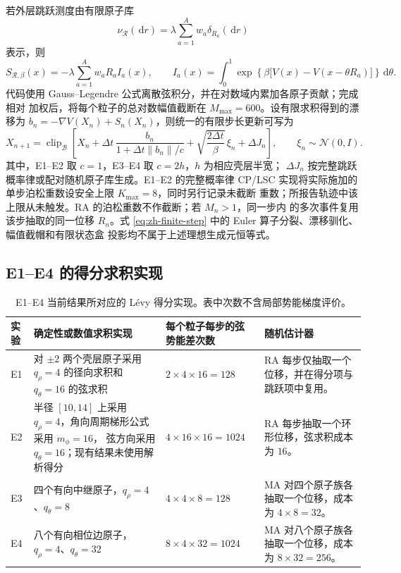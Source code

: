\documentclass[11pt,a4paper]{article}
\newcommand{\dd}{\,\mathrm{d}}
\begin{document}
若外层跳跃测度由有限原子库
\begin{equation}
 \nu_{\mathcal R}(\dd r)
 =\lambda\sum_{a=1}^{A}w_a\delta_{R_a}(\dd r)
\end{equation}
表示，则
\begin{equation}
 S_{\mathcal R,\beta}(x)
 =-\lambda\sum_{a=1}^{A}w_aR_a I_a(x),\qquad
 I_a(x)=\int_0^1
 \exp\!\left\{\beta\bigl[V(x)-V(x-\theta R_a)\bigr]\right\}\dd\theta .
\end{equation}
代码使用 Gauss--Legendre 公式离散弦积分，并在对数域内累加各原子贡献；完成相对
加权后，将每个粒子的总对数幅值截断在 $M_{\max}=600$。设有限求积得到的漂移为
$b_n=-\nabla V(X_n)+S_n(X_n)$，则统一的有限步长更新可写为
\begin{equation}
 X_{n+1}
 =\operatorname{clip}_{\mathcal B}\!\left[
 X_n+\Delta t\,\frac{b_n}{1+\Delta t\|b_n\|/c}
 +\sqrt{\frac{2\Delta t}{\beta}}\,\xi_n+\Delta J_n
 \right],
 \qquad \xi_n\sim\mathcal N(0,I).
 \label{eq:zh-finite-step}
\end{equation}
其中，E1--E2 取 $c=1$，E3--E4 取 $c=2h$，$h$ 为相应壳层半宽；
$\Delta J_n$ 按完整跳跃概率律或配对随机原子库生成。E1--E2 的完整概率律
CP/LSC 实现将实际施加的单步泊松重数设安全上限 $K_{\max}=8$，同时另行记录未截断
重数；所报告轨迹中该上限从未触发。RA 的泊松重数不作截断；若 $M_n>1$，同一步内
的多次事件复用该步抽取的同一位移 $R_n$。式
\eqref{eq:zh-finite-step} 中的 Euler 算子分裂、漂移驯化、幅值截帽和有限状态盒
投影均不属于上述理想生成元恒等式。

\subsection{E1--E4 的得分求积实现}

\begin{table}[H]
\centering
\small
\begin{tabularx}{\textwidth}{L{1.4cm}L{5.1cm}C{2.3cm}Y}
\toprule
实验 & 确定性或数值求积实现 & 每个粒子每步的弦势能差次数 & 随机估计器 \\
\midrule
E1 &
对 $\pm2$ 两个壳层原子采用 $q_\rho=4$ 的径向求积和 $q_\theta=16$ 的弦求积 &
$2\times4\times16=128$ &
RA 每步仅抽取一个位移，并在得分项与跳跃项中复用。 \\
E2 &
半径 $[10,14]$ 上采用 $q_\rho=4$，角向周期梯形公式采用 $m_\phi=16$，
弦方向采用 $q_\theta=16$；现有结果未使用解析得分 &
$4\times16\times16=1024$ &
RA 每步抽取一个环形位移，弦求积成本为 $16$。 \\
E3 &
四个有向中继原子，$q_\rho=4$、$q_\theta=8$ &
$4\times4\times8=128$ &
MA 对四个原子族各抽取一个位移，成本为 $4\times8=32$。 \\
E4 &
八个有向相位边原子，$q_\rho=4$、$q_\theta=32$ &
$8\times4\times32=1024$ &
MA 对八个原子族各抽取一个位移，成本为 $8\times32=256$。 \\
\bottomrule
\end{tabularx}
\caption{E1--E4 当前结果所对应的 Lévy 得分实现。表中次数不含局部势能梯度评价。}
\end{table}
\end{document}
